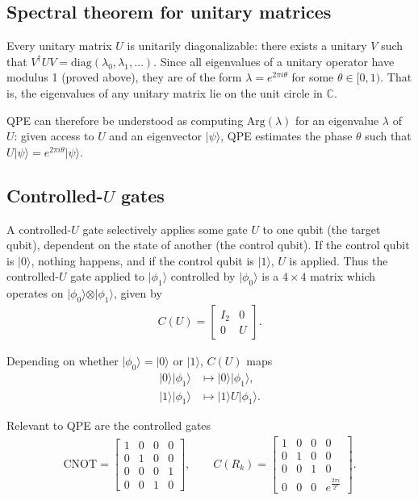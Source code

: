 \documentclass[11pt]{article}
\begin{document}
\subsection{Spectral theorem for unitary matrices}

Every unitary matrix $U$ is unitarily diagonalizable: there exists a unitary $V$ such that $V^\dagger U V = \text{diag}(\lambda_0, \lambda_1, \ldots)$. Since all eigenvalues of a unitary operator have modulus 1 (proved above), they are of the form $\lambda = e^{2\pi i \theta}$ for some $\theta \in [0, 1)$. That is, the eigenvalues of any unitary matrix lie on the unit circle in $\mathbb{C}$.

QPE can therefore be understood as computing $\text{Arg}(\lambda)$ for an eigenvalue $\lambda$ of $U$: given access to $U$ and an eigenvector $\vert \psi \rangle$, QPE estimates the phase $\theta$ such that $U\vert\psi\rangle = e^{2\pi i \theta}\vert\psi\rangle$.

\subsection{Controlled-$U$ gates}

A controlled-$U$ gate selectively applies some gate $U$ to one qubit (the target qubit), dependent on the state of another (the control qubit). If the control qubit is $\vert 0 \rangle$, nothing happens, and if the control qubit is $\vert 1 \rangle$, $U$ is applied. Thus the controlled-$U$ gate applied to $\vert \phi_1 \rangle$ controlled by $\vert \phi_0 \rangle$ is a $4\times 4$ matrix which operates on $\vert \phi_0 \rangle \otimes \vert \phi_1 \rangle$, given by
\begin{align*}
C(U) = \begin{bmatrix} I_2 & 0 \\ 0 & U \end{bmatrix}.
\end{align*}

Depending on whether $\vert \phi_0 \rangle = \vert 0 \rangle$ or $\vert 1 \rangle$, $C(U)$ maps
\begin{align*}
\vert 0 \rangle \vert \phi_1 \rangle &\mapsto \vert 0 \rangle \vert \phi_1 \rangle, \\
\vert 1 \rangle \vert \phi_1 \rangle &\mapsto \vert 1 \rangle U \vert \phi_1 \rangle.
\end{align*}

Relevant to QPE are the controlled gates
\begin{align*}
\text{CNOT} = \begin{bmatrix} 1 & 0 & 0 & 0 \\ 0 & 1 & 0 & 0 \\ 0 & 0 & 0 & 1 \\ 0 & 0 & 1 & 0 \end{bmatrix},
\qquad
C(R_k) = \begin{bmatrix} 1 & 0 & 0 & 0 \\ 0 & 1 & 0 & 0 \\ 0 & 0 & 1 & 0 \\ 0 & 0 & 0 & e^{\frac{2\pi i}{2^k}} \end{bmatrix}.
\end{align*}
\end{document}
